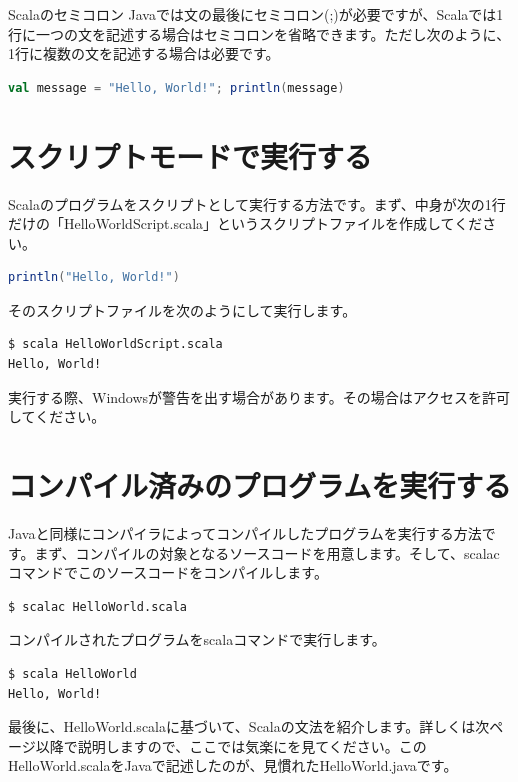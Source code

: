 \begin{itembox}[l]{Scalaのセミコロン}
Javaでは文の最後にセミコロン(;)が必要ですが、Scalaでは1行に一つの文を記述する場合はセミコロンを省略できます。ただし次のように、1行に複数の文を記述する場合は必要です。
\begin{lstlisting}[language=scala, frame=none]
val message = "Hello, World!"; println(message)
\end{lstlisting}
\end{itembox}

\section{スクリプトモードで実行する}
Scalaのプログラムをスクリプトとして実行する方法です。まず、中身が次の1行だけの「HelloWorldScript.scala」というスクリプトファイルを作成してください。
\begin{lstlisting}[language=scala, frame=none]
println("Hello, World!")
\end{lstlisting}
そのスクリプトファイルを次のようにして実行します。
\begin{lstlisting}[language=bash, frame=none]
$ scala HelloWorldScript.scala
Hello, World!
\end{lstlisting}
実行する際、Windowsが警告を出す場合があります。その場合はアクセスを許可してください。 

\section{コンパイル済みのプログラムを実行する}
Javaと同様にコンパイラによってコンパイルしたプログラムを実行する方法です。まず、コンパイルの対象となるソースコードを用意します。そして、scalacコマンドでこのソースコードをコンパイルします。
\begin{lstlisting}[language=bash, frame=none]
$ scalac HelloWorld.scala
\end{lstlisting}
コンパイルされたプログラムをscalaコマンドで実行します。
\begin{lstlisting}[language=bash, frame=none]
$ scala HelloWorld
Hello, World!
\end{lstlisting}
最後に、HelloWorld.scalaに基づいて、Scalaの文法を紹介します。詳しくは次ページ以降で説明しますので、ここでは気楽にを見てください。このHelloWorld.scalaをJavaで記述したのが、見慣れたHelloWorld.javaです。

